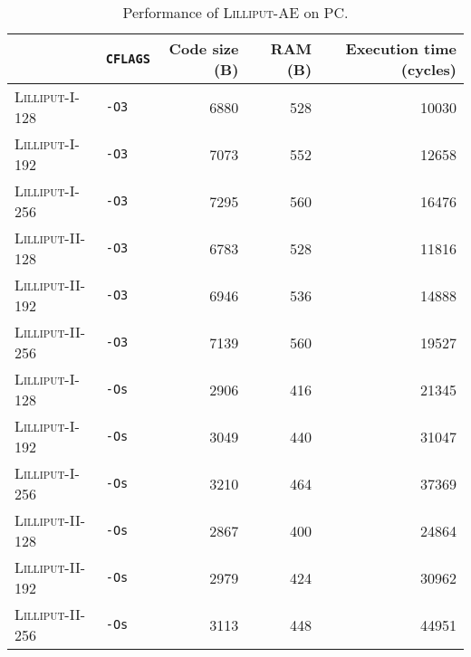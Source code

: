 \begin{table}[H]
  \centering
  \begin{tabular}{l|l||r|r|r}
      \textbf{}                & \textbf{\texttt{CFLAGS}} & \textbf{Code size (B)} & \textbf{RAM (B)} & \textbf{Execution time (cycles)} \\ \hline
      \textsc{Lilliput-I-128}  & \texttt{-O3}             &                   6880 &              528 &                            10030 \\ \hline
      \textsc{Lilliput-I-192}  & \texttt{-O3}             &                   7073 &              552 &                            12658 \\ \hline
      \textsc{Lilliput-I-256}  & \texttt{-O3}             &                   7295 &              560 &                            16476 \\ \hline
      \textsc{Lilliput-II-128} & \texttt{-O3}             &                   6783 &              528 &                            11816 \\ \hline
      \textsc{Lilliput-II-192} & \texttt{-O3}             &                   6946 &              536 &                            14888 \\ \hline
      \textsc{Lilliput-II-256} & \texttt{-O3}             &                   7139 &              560 &                            19527 \\ \hline
      \textsc{Lilliput-I-128}  & \texttt{-Os}             &                   2906 &              416 &                            21345 \\ \hline
      \textsc{Lilliput-I-192}  & \texttt{-Os}             &                   3049 &              440 &                            31047 \\ \hline
      \textsc{Lilliput-I-256}  & \texttt{-Os}             &                   3210 &              464 &                            37369 \\ \hline
      \textsc{Lilliput-II-128} & \texttt{-Os}             &                   2867 &              400 &                            24864 \\ \hline
      \textsc{Lilliput-II-192} & \texttt{-Os}             &                   2979 &              424 &                            30962 \\ \hline
      \textsc{Lilliput-II-256} & \texttt{-Os}             &                   3113 &              448 &                            44951 \\ \hline
  \end{tabular}
  \caption{Performance of \textsc{Lilliput-AE} on PC.}
  \label{table:results/lilliput-pc}
\end{table}
